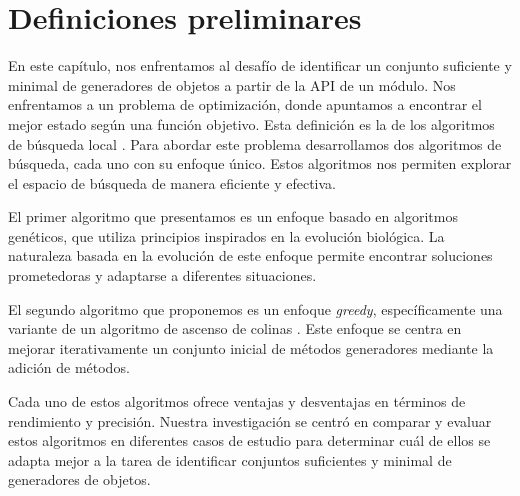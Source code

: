 
\section{Definiciones preliminares}
\label{sec:preliminares}


En este capítulo, nos enfrentamos al desafío de identificar un conjunto suficiente y minimal de generadores de objetos a partir de la API de un módulo. 
Nos enfrentamos a un problema de optimización, donde apuntamos a encontrar el mejor estado según una función objetivo.
Esta definición es la de los algoritmos de búsqueda local \cite{Russell:2009}.
Para abordar este problema desarrollamos dos algoritmos de búsqueda, cada uno con su enfoque único. Estos algoritmos nos permiten explorar el espacio de búsqueda de manera eficiente y efectiva.

El primer algoritmo que presentamos es un enfoque basado en algoritmos genéticos, que utiliza principios inspirados en la evolución biológica. \cite{Goldberg:1989}
La naturaleza basada en la evolución de este enfoque permite encontrar soluciones prometedoras y adaptarse a diferentes situaciones.

El segundo algoritmo que proponemos es un enfoque \emph{greedy}, específicamente una variante de un algoritmo de ascenso de colinas \cite{Russell:2009,Cormen2009}. Este enfoque se centra en mejorar iterativamente un conjunto inicial de métodos generadores mediante la adición de métodos.


Cada uno de estos algoritmos ofrece ventajas y desventajas en términos de rendimiento y precisión. Nuestra investigación se centró en comparar y evaluar estos algoritmos en diferentes casos de estudio para determinar cuál de ellos se adapta mejor a la tarea de identificar conjuntos suficientes y minimal de generadores de objetos.

